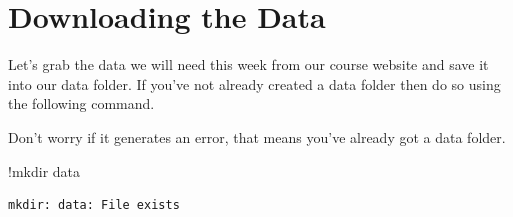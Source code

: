 \documentclass[
  letterpaper,
  DIV=11,
  numbers=noendperiod]{scrreprt}
\newenvironment{Shaded}{\begin{snugshade}}{\end{snugshade}}
\newcommand{\NormalTok}[1]{\textcolor[rgb]{0.00,0.23,0.31}{#1}}
\newcommand{\OperatorTok}[1]{\textcolor[rgb]{0.37,0.37,0.37}{#1}}
\begin{document}
\hypertarget{downloading-the-data-3}{%
\section{Downloading the Data}\label{downloading-the-data-3}}

Let's grab the data we will need this week from our course website and
save it into our data folder. If you've not already created a data
folder then do so using the following command.

Don't worry if it generates an error, that means you've already got a
data folder.

\begin{Shaded}
\begin{Highlighting}[]
\OperatorTok{!}\NormalTok{mkdir data}
\end{Highlighting}
\end{Shaded}

\begin{verbatim}
mkdir: data: File exists
\end{verbatim}
\end{document}
